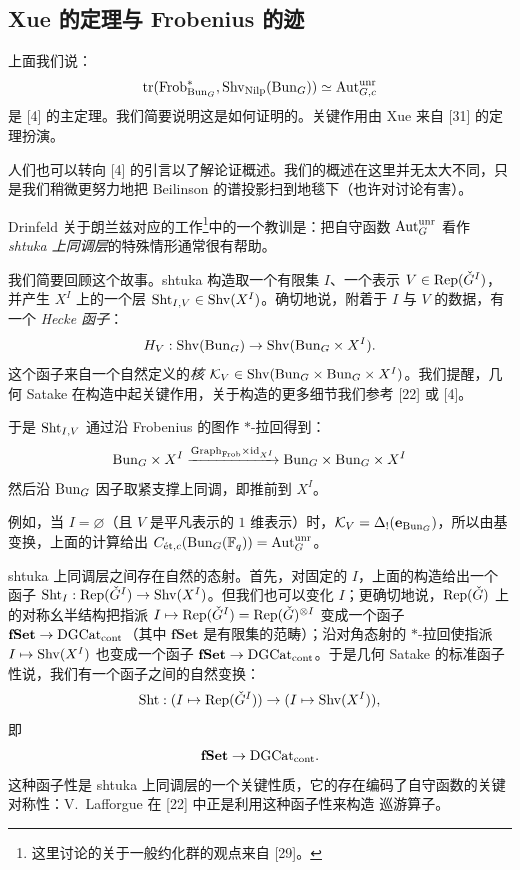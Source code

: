 \subsection{Xue 的定理与 Frobenius 的迹}

\pnum{}上面我们说：
\begin{equation}
  \mathrm{tr}(\Frob^*_{\Bun_G}, \Shv_{\Nilp}(\Bun_G)) \simeq \Aut^{\unr}_{G,c}
\end{equation}
是 [4] 的主定理。我们简要说明这是如何证明的。关键作用由 Xue 来自 [31] 的定理扮演。

人们也可以转向 [4] 的引言以了解论证概述。我们的概述在这里并无太大不同，只是我们稍微更努力地把 Beilinson 的谱投影扫到地毯下（也许对讨论有害）。

 Drinfeld 关于朗兰兹对应的工作\footnote{这里讨论的关于一般约化群的观点来自 [29]。}中的一个教训是：把自守函数 $\Aut^{\unr}_G$ 看作 \emph{shtuka 上同调层}的特殊情形通常很有帮助。

我们简要回顾这个故事。shtuka 构造取一个有限集 $I$、一个表示 $V \in \Rep(\bG^I)$，并产生 $X^I$ 上的一个层 $\Sht_{I,V} \in \Shv(X^I)$。确切地说，附着于 $I$ 与 $V$ 的数据，有一个 \emph{Hecke 函子}：
\[
  H_V: \Shv(\Bun_G) \to \Shv(\Bun_G \times X^I).
\]
这个函子来自一个自然定义的\emph{核} $\mathcal{K}_V \in \Shv(\Bun_G \times \Bun_G \times X^I)$。我们提醒，几何 Satake 在构造中起关键作用，关于构造的更多细节我们参考 [22] 或 [4]。

于是 $\Sht_{I,V}$ 通过沿 Frobenius 的图作 $*$-拉回得到：
\[
  \Bun_G \times X^I \xrightarrow{\mathrm{Graph}_{\Frob} \times \mathrm{id}_{X^I}} \Bun_G \times \Bun_G \times X^I
\]
然后沿 $\Bun_G$ 因子取紧支撑上同调，即推前到 $X^I$。

例如，当 $I = \varnothing$（且 $V$ 是平凡表示的 $1$ 维表示）时，$\mathcal{K}_V = \Delta_!(\mathbf{e}_{\Bun_G})$，所以由基变换，上面的计算给出 $C_{\et,c}(\Bun_G(\F_q)) = \Aut^{\unr}_G$。

shtuka 上同调层之间存在自然的态射。首先，对固定的 $I$，上面的构造给出一个函子 $\Sht_I: \Rep(\bG^I) \to \Shv(X^I)$。但我们也可以变化 $I$；更确切地说，$\Rep(\bG)$ 上的对称幺半结构把指派 $I \mapsto \Rep(\bG^I) = \Rep(\bG)^{\otimes I}$ 变成一个函子 $\mathbf{fSet} \to \DGCat_{\mathrm{cont}}$（其中 $\mathbf{fSet}$ 是有限集的范畴）；沿对角态射的 $*$-拉回使指派 $I \mapsto \Shv(X^I)$ 也变成一个函子 $\mathbf{fSet} \to \DGCat_{\mathrm{cont}}$。于是几何 Satake 的标准函子性说，我们有一个函子之间的自然变换：
\[
  \Sht: (I \mapsto \Rep(\bG^I)) \to (I \mapsto \Shv(X^I)),
\]
即
\[
  \mathbf{fSet} \to \DGCat_{\mathrm{cont}}.
\]
这种函子性是 shtuka 上同调层的一个关键性质，它的存在编码了自守函数的关键对称性：V.~Lafforgue 在 [22] 中正是利用这种函子性来构造 巡游算子。

